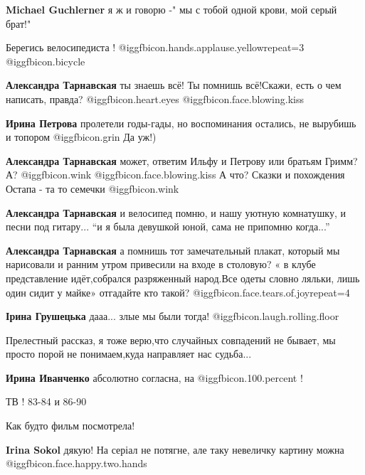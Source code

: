 \begin{itemize}
\begin{itemize}
\textbf{Michael Guchlerner} я ж и говорю -" мы с тобой одной крови, мой серый брат!"
\end{itemize} %

Берегись велосипедиста !  @igg{fbicon.hands.applause.yellow}{repeat=3}  @igg{fbicon.bicycle} 

\begin{itemize} %
\textbf{Александра Тарнавская} ты знаешь всё! Ты помнишь всё!Скажи, есть о чем написать, правда?  @igg{fbicon.heart.eyes}  @igg{fbicon.face.blowing.kiss} 

\textbf{Ирина Петрова} пролетели годы-гады, но воспоминания остались, не вырубишь и топором @igg{fbicon.grin} 
Да уж!)

\textbf{Александра Тарнавская} может, ответим Ильфу и Петрову или братьям Гримм? А? @igg{fbicon.wink}  @igg{fbicon.face.blowing.kiss}  А что? Сказки и похождения Остапа - та то семечки @igg{fbicon.wink} 

\textbf{Александра Тарнавская} и велосипед помню, и нашу уютную комнатушку, и песни под гитару... 
\enquote{и я была девушкой юной, сама не припомню когда...}

\textbf{Александра Тарнавская} а помнишь тот замечательный плакат, который мы нарисовали и ранним утром привесили на входе в столовую? « в клубе представление идёт,собрался разряженный народ.Все одеты словно ляльки, лишь один сидит у майке» отгадайте кто такой? @igg{fbicon.face.tears.of.joy}{repeat=4} 

\textbf{Ірина Грушецька} дааа... злые мы были тогда! @igg{fbicon.laugh.rolling.floor} 
\end{itemize} %

Прелестный рассказ, я тоже верю,что случайных совпадений не бывает, мы просто порой не понимаем,куда направляет нас судьба...

\textbf{Ирина Иванченко} абсолютно согласна, на  @igg{fbicon.100.percent} !

ТВ ! 83-84 и 86-90

Как будто фильм посмотрела!

\begin{itemize} %
\textbf{Irina Sokol} дякую! На серіал не потягне, але таку невеличку картину можна @igg{fbicon.face.happy.two.hands} 


\end{itemize}
\end{itemize}
